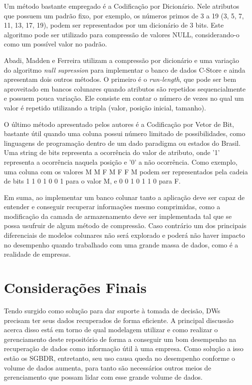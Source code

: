 Um método bastante empregado é a Codificação por Dicionário. Nele atributos que possuem um padrão fixo, por exemplo, os números primos de 
3 a 19 (3, 5, 7, 11, 13, 17, 19), podem ser representados por um dicionário de 3 bits. Este algoritmo pode ser utilizado para compressão 
de valores NULL, considerando-o como um possível valor no padrão.

Abadi, Madden e Ferreira \cite{abadi2006integrating} utilizam a compressão por dicionário e uma variação do algoritmo \textit{null supression} para implementar o banco de dados C-Store e ainda apresentam dois outros métodos. O primeiro é o \textit{run-length}, que pode ser bem aproveitado 
em bancos colunares quando atributos são repetidos sequencialmente e possuem pouca variação. Ele consiste em contar o número de vezes no qual 
um valor é repetido utilizando a tripla (valor, posição inicial, tamanho). 




O último método apresentado pelos autores é a Codificação por Vetor de Bit, bastante útil quando uma coluna possui número limitado 
de possibilidades, como linguagens de programação dentro de um dado paradigma ou estados do Brasil. Uma string de bits representa a 
ocorrência do valor de atributo, onde '1' representa a ocorrência naquela posição e '0' a não ocorrência. Como exemplo, uma coluna com os 
valores {M M F M F F M} podem ser representados pela cadeia de bits 1 1 0 1 0 0 1 para o valor M, e 0 0 1 0 1 1 0 para F.

Em suma, ao implementar um banco colunar tanto a aplicação deve ser capaz de entender e conseguir recuperar informações mesmo comprimidas, como a modificação da camada de armazenamento deve ser implementada tal que se possa usufruir de algum método de compressão. Caso contrário um 
dos principais diferenciais de modelos colunares não será explorado e poderá não haver impacto no desempenho quando trabalhado com uma 
grande massa de dados, como é a realidade de empresas.

\section{Considerações Finais}


Tendo surgido como solução para dar suporte à tomada de decisão, DWs precisam ter seus dados recuperados de forma eficiente. A principal discussão acerca disso está em torno de qual modelagem utilizar e como realizar o gerenciamento deste repositório de forma a conseguir um bom desempenho na recuperação de dados como informação útil à uma empresa. Como solução a isso estão os SGBDR, entretanto, seu uso causa queda no desempenho conforme o volume de dados aumenta, para tanto são necessários outros meios de gerenciamento que possam lidar com esse grande volume de dados.

